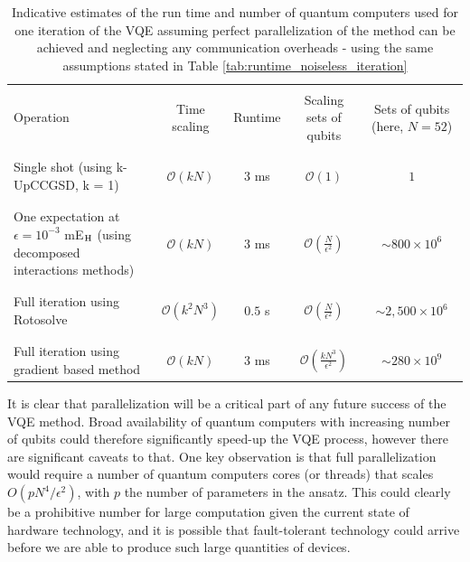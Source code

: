 \begin{table}
\caption{Indicative estimates of the run time and number of quantum computers used for one iteration of the VQE assuming perfect parallelization of the method can be achieved and neglecting any communication overheads - using the same assumptions stated in Table \ref{tab:runtime_noiseless_iteration}} \label{tab:parallel_computation}
\begin{tabularx}{\linewidth}{Xcccc}
\toprule
\\
Operation & Time scaling & Runtime & Scaling sets of qubits & Sets of qubits (here, $N=52$)\\
\\ \midrule \\
Single shot (using k-UpCCGSD, k = 1) & $\mathcal{O}(kN)$ & $3$ ms & $\mathcal{O}(1)$ & $1$\\
\\ \hline \\
One expectation at $\epsilon = 10^{-3}$ mE$_{\rm H}$ (using decomposed interactions methods) & $\mathcal{O}(kN)$ &  $3$ ms & $\mathcal{O}(\frac{N}{\epsilon^2})$ & $\sim 800 \times 10^6$ \\
\\ \hline \\
Full iteration using Rotosolve & $\mathcal{O}(k^2N^3)$ & $0.5$ s & $\mathcal{O}(\frac{N}{\epsilon^2})$ &$\sim 2,500 \times 10^6$ \\
\\ \hline \\
Full iteration using gradient based method & $\mathcal{O}(kN)$ & $3$ ms & $\mathcal{O}(\frac{kN^3}{\epsilon^2})$ & $\sim 280 \times 10^9$  \\
\bottomrule
\end{tabularx}

\end{table}

It is clear that parallelization will be a critical part of any future success of the VQE method. Broad availability of quantum computers with increasing number of qubits could therefore significantly speed-up the VQE process, however there are significant caveats to that. One key observation is that full parallelization would require a number of quantum computers cores (or threads) that scales $O(p N^4 / \epsilon^2)$, with $p$ the number of parameters in the ansatz. This could clearly be a prohibitive number for large computation given the current state of hardware technology, and it is possible that fault-tolerant technology could arrive before we are able to produce such large quantities of devices. 

